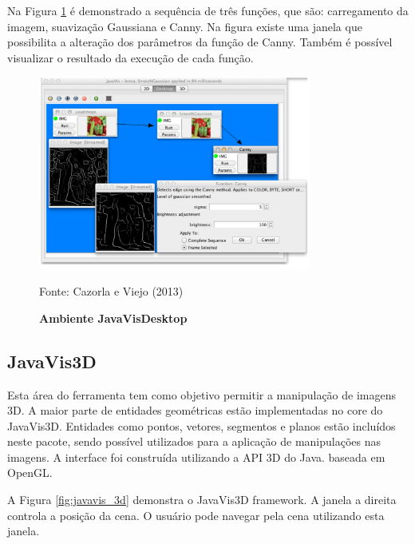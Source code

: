 \documentclass[
	12pt,				%
	oneside,			%
	a4paper,			%
	english,			%
	french,				%
	spanish,			%
	brazil,				%
	]{abntex2}
\begin{document}
Na Figura \ref{fig:javavis_desktop} é demonstrado a sequência de três funções, que são: carregamento da imagem, suavização Gaussiana e Canny. Na figura existe uma janela que possibilita a alteração dos parâmetros da função de Canny. Também é possível visualizar o resultado da execução de cada função.

\begin{figure}[ht]
\centering
\caption{\textbf{Ambiente JavaVisDesktop}}
\includegraphics[width=0.8\textwidth]{imagens/javavis_desktop.png}

Fonte: Cazorla e Viejo  (2013)
\label{fig:javavis_desktop}
\end{figure}

\subsection{JavaVis3D}

Esta área do ferramenta tem como objetivo permitir a manipulação de imagens 3D. A maior parte de entidades geométricas estão implementadas no core do JavaVis3D. Entidades como pontos, vetores, segmentos e planos estão incluídos neste pacote, sendo possível utilizados para a aplicação de manipulações nas imagens. A interface foi construída utilizando a API 3D do Java. baseada em OpenGL.

A Figura \ref{fig:javavis_3d} demonstra o JavaVis3D framework. A janela a direita controla a posição da cena. O usuário pode navegar pela cena utilizando esta janela.
\end{document}
